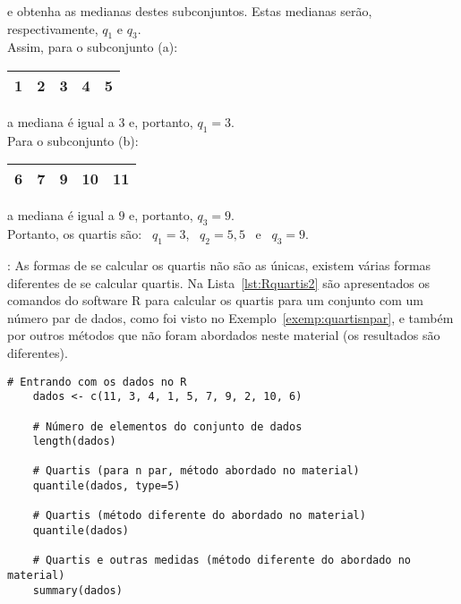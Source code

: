 \documentclass[11pt,fleqn]{book} %
\begin{document}
\begin{example}
\noindent e obtenha as medianas destes subconjuntos. Estas medianas serão, respectivamente, $q_1$ e $q_3$. \\

Assim, para o subconjunto (a):

\begin{center}
	\begin{tabular}{c c c c c}
	\hline
	1 & 2 & \textcolor{ocre}{\bf 3} & 4 & 5 \\
	\hline
	\end{tabular}
\end{center}

\noindent a mediana é igual a $3$ e, portanto, $q_1=3$. \\

Para o subconjunto (b):

\begin{center}
	\begin{tabular}{c c c c c}
	\hline
	6 & 7 & \textcolor{ocre}{\bf 9} & 10 & 11 \\
	\hline
	\end{tabular}
\end{center}

\noindent a mediana é igual a $9$ e, portanto, $q_3=9$. \\


Portanto, os quartis são: \, $q_1=3$, \, $q_2=5,5$ \, e \, $q_3=9$. 


\end{example}

\vspace{0,3cm}

: As formas de se calcular os quartis não são as únicas, existem várias formas diferentes de se calcular quartis. Na Lista~\ref{lst:Rquartis2} são apresentados os comandos do software R para calcular os quartis para um conjunto com um número par de dados, como foi visto no Exemplo~\ref{exemp:quartisnpar}, e também por outros métodos que não foram abordados neste material (os resultados são diferentes). \\

\begin{scriptsize}
	\estiloR
	\begin{lstlisting}[caption={Comandos do software R}, label=lst:Rquartis2]
	# Entrando com os dados no R
	dados <- c(11, 3, 4, 1, 5, 7, 9, 2, 10, 6)
	
	# Número de elementos do conjunto de dados
	length(dados)

	# Quartis (para n par, método abordado no material)
	quantile(dados, type=5)

	# Quartis (método diferente do abordado no material)
	quantile(dados)

	# Quartis e outras medidas (método diferente do abordado no material)
	summary(dados)

	\end{lstlisting}
\end{scriptsize}
\end{document}
